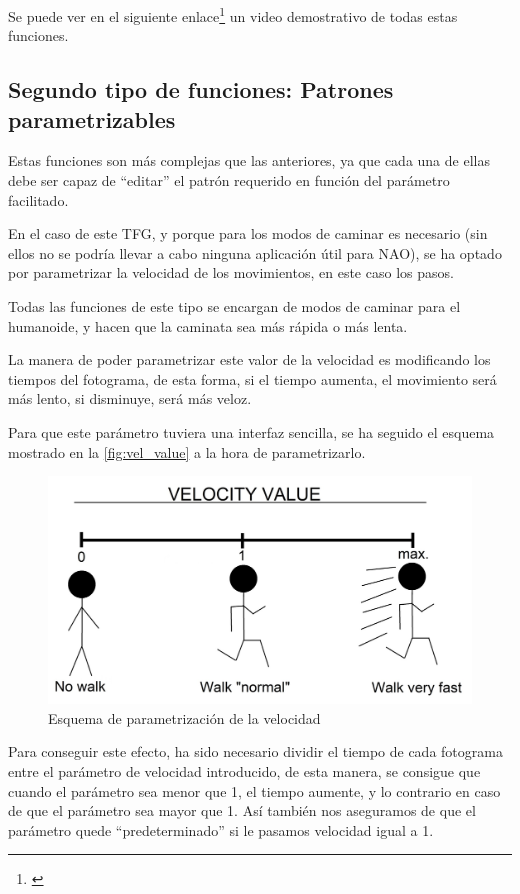 Se puede ver en el siguiente enlace\footnote{\url{}} un video demostrativo de todas estas funciones.

\subsection{Segundo tipo de funciones: Patrones parametrizables}

Estas funciones son más complejas que las anteriores, ya que cada una de ellas debe ser capaz de ``editar'' el patrón requerido en función del parámetro facilitado.

En el caso de este TFG, y porque para los modos de caminar es necesario (sin ellos no se podría llevar a cabo ninguna aplicación útil para NAO), se ha optado por parametrizar la velocidad de los movimientos, en este caso los pasos.

Todas las funciones de este tipo se encargan de modos de caminar para el humanoide, y hacen que la caminata sea más rápida o más lenta.

La manera de poder parametrizar este valor de la velocidad es modificando los tiempos del fotograma, de esta forma, si el tiempo aumenta, el movimiento será más lento, si disminuye, será más veloz.

Para que este parámetro tuviera una interfaz sencilla, se ha seguido el esquema mostrado en la \autoref{fig:vel_value} a la hora de parametrizarlo.

\begin{figure}[H]
  \centering
  \includegraphics[width=1\textwidth]{figures/cap_4/velocity_value.jpeg}
  \caption{Esquema de parametrización de la velocidad}
  \label{fig:vel_value}
\end{figure}

Para conseguir este efecto, ha sido necesario dividir el tiempo de cada fotograma entre el parámetro de velocidad introducido, de esta manera, se consigue que cuando el parámetro sea menor que 1, el tiempo aumente, y lo contrario en caso de que el parámetro sea mayor que 1. Así también nos aseguramos de que el parámetro quede ``predeterminado'' si le pasamos velocidad igual a 1.

